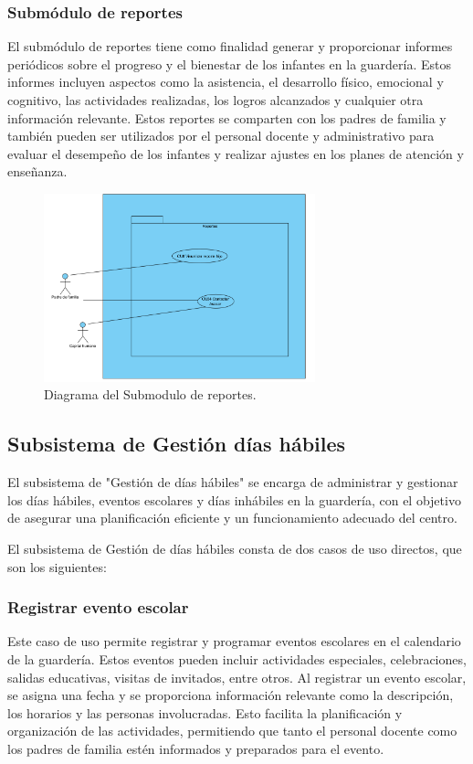 \subsubsection{Submódulo de reportes}
El submódulo de reportes tiene como finalidad generar y proporcionar informes periódicos sobre el progreso y el bienestar de los infantes en la guardería. Estos informes incluyen aspectos como la asistencia, el desarrollo físico, emocional y cognitivo, las actividades realizadas, los logros alcanzados y cualquier otra información relevante. Estos reportes se comparten con los padres de familia y también pueden ser utilizados por el personal docente y administrativo para evaluar el desempeño de los infantes y realizar ajustes en los planes de atención y enseñanza.

\begin{figure}[htbp]
\centering
\includegraphics[width=0.7\textwidth]{images/arqui/subSisGestInfantReportes.png}
\caption{Diagrama del Submodulo de reportes.}
\label{fig:subsistGestionInfanReportes}
\end{figure}

\clearpage
\subsection{Subsistema de Gestión días hábiles}

El subsistema de "Gestión de días hábiles" se encarga de administrar y gestionar los días hábiles, eventos escolares y días inhábiles en la guardería, con el objetivo de asegurar una planificación eficiente y un funcionamiento adecuado del centro.

El subsistema de Gestión de días hábiles consta de dos casos de uso directos, que son los siguientes:

\subsubsection{Registrar evento escolar}
Este caso de uso permite registrar y programar eventos escolares en el calendario de la guardería. Estos eventos pueden incluir actividades especiales, celebraciones, salidas educativas, visitas de invitados, entre otros. Al registrar un evento escolar, se asigna una fecha y se proporciona información relevante como la descripción, los horarios y las personas involucradas. Esto facilita la planificación y organización de las actividades, permitiendo que tanto el personal docente como los padres de familia estén informados y preparados para el evento.

